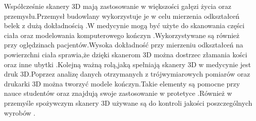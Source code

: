 \documentclass[12pt]{article}
\begin{document}
\newline
Współcześnie skanery 3D mają zastosowanie w większości gałęzi życia oraz przemysłu.Przemysł budowlany wykorzystuje je w celu mierzenia odkształceń belek z dużą dokładnością \cite{goszczynska2014doswiadczalna}.W medycynie mogą być użyte do skanowania części ciała oraz modelowania komputerowego kończyn \cite{tomaka20053d}.Wykorzystywane są również przy oględzinach pacjentów.Wysoka dokładność przy mierzeniu odkształceń na powierzchni ciała sprawia,że dzięki skanerom 3D można dostrzec złamania kości oraz inne ubytki \cite{thali2003optical}.Kolejną ważną rolą,jaką spełniają skanery 3D w medycynie jest druk 3D.Poprzez analizę danych otrzymanych z trójwymiarowych pomiarów oraz drukarki 3D można tworzyć modele kończyn.Takie elementy są pomocne przy nauce studentów oraz znajdują swoje zastosowanie w protetyce \cite{mcmenamin2014production}.Również w przemyśle spożywczym skanery 3D używane są do kontroli jakości poszczególnych wyrobów \cite{anders2012zastosowanie}.



\end{document}
